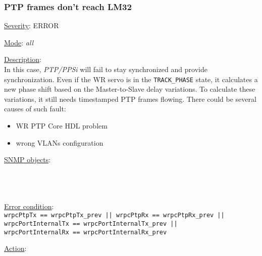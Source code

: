 \subsubsection{\bf PTP frames don't reach LM32}
		\label{fail:timing:no_frames}
		\begin{pck_descr}
			\item [] \underline{Severity}: ERROR
			\item [] \underline{Mode}: \emph{all}
			\item [] \underline{Description}:\\
				In this case, \emph{PTP/PPSi} will fail to stay synchronized and provide
				synchronization. Even if the WR servo is in the \texttt{TRACK\_PHASE}
				state, it calculates a new phase shift based on the Master-to-Slave delay
				variations. To calculate these variations, it still needs timestamped
				PTP frames flowing. There could be several causes of such fault:
				\begin{itemize}
					\item WR PTP Core HDL problem
					\item wrong VLANs configuration
				\end{itemize}
			\item [] \underline{SNMP objects}:\\
				{\footnotesize
				\\
				\\
				\\
				 }
			\item [] \underline{Error condition}:\\
				{\footnotesize
				\texttt{wrpcPtpTx == wrpcPtpTx\_prev || wrpcPtpRx == wrpcPtpRx\_prev ||}\\
				\texttt{wrpcPortInternalTx == wrpcPortInternalTx\_prev ||}\\
				\texttt{wrpcPortInternalRx == wrpcPortInternalRx\_prev} }
      \item [] \underline{Action}:\\
		\end{pck_descr}

